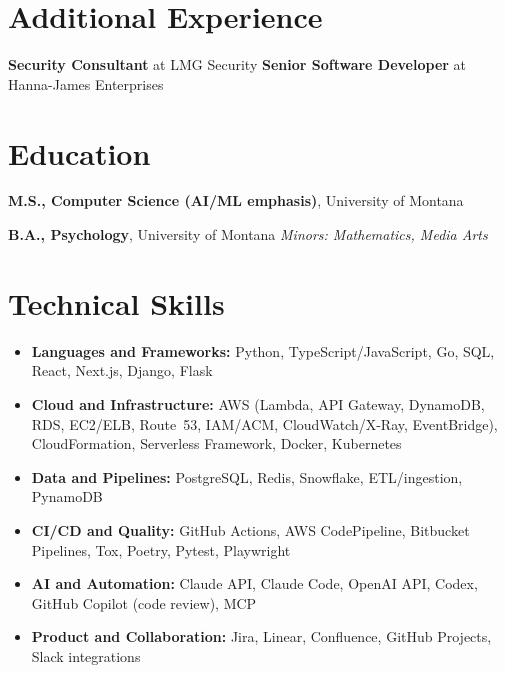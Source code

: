 \documentclass[10pt]{article}
\begin{document}
\section*{Additional Experience}
\noindent\textbf{Security Consultant} at LMG Security \quad \textbf{Senior Software Developer} at Hanna-James Enterprises\par


\section*{Education}
\textbf{M.S., Computer Science (AI/ML emphasis)}, University of Montana\par
\textbf{B.A., Psychology}, University of Montana \quad \emph{Minors: Mathematics, Media Arts}\par


\section*{Technical Skills}
\begin{itemize}[leftmargin=*]
  \item \textbf{Languages and Frameworks:} Python, TypeScript/JavaScript, Go, SQL, React, Next.js, Django, Flask
  \item \textbf{Cloud and Infrastructure:} AWS (Lambda, API Gateway, DynamoDB, RDS, EC2/ELB, Route~53, IAM/ACM, CloudWatch/X-Ray, EventBridge), CloudFormation, Serverless Framework, Docker, Kubernetes
  \item \textbf{Data and Pipelines:} PostgreSQL, Redis, Snowflake, ETL/ingestion, PynamoDB
  \item \textbf{CI/CD and Quality:} GitHub Actions, AWS CodePipeline, Bitbucket Pipelines, Tox, Poetry, Pytest, Playwright
  \item \textbf{AI and Automation:} Claude API, Claude Code, OpenAI API, Codex, GitHub Copilot (code review), MCP
  \item \textbf{Product and Collaboration:} Jira, Linear, Confluence, GitHub Projects, Slack integrations
\end{itemize}
\end{document}
